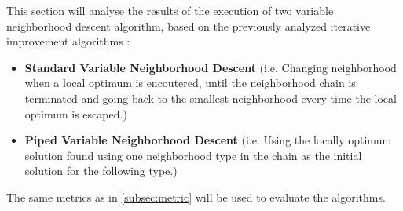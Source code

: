 \begin{homeworkProblem}
This section will analyse the results of the execution of two variable neighborhood descent algorithm, based on the previously analyzed iterative improvement algorithms :
\begin{itemize}
\item \textbf{Standard Variable Neighborhood Descent} (i.e. Changing neighborhood when a local optimum is encoutered, until the neighborhood chain is terminated and going back to the smallest neighborhood every time the local optimum is escaped.)
\item \textbf{Piped Variable Neighborhood Descent} (i.e. Using the locally optimum solution found using one neighborhood type in the chain as the initial solution for the following type.)
\end{itemize}
The same metrics as in \ref{subsec:metric} will be used to evaluate the algorithms.





\end{homeworkProblem}
